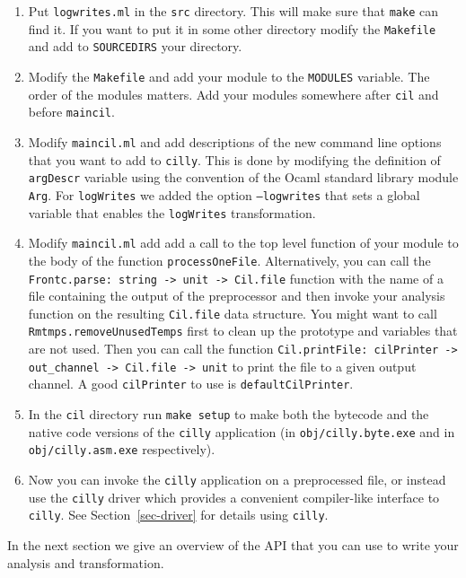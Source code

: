 \documentclass{article}
\def\secref#1{Section~\ref{sec-#1}}
\def\t#1{{\tt #1}}
\begin{document}
 \begin{enumerate}
 \item Put \t{logwrites.ml} in the \t{src} directory. This will make sure that
 \t{make} can find it. If you want to put it in some other directory modify
 the \t{Makefile} and add to \t{SOURCEDIRS} your directory. 

 \item Modify the \t{Makefile} and add your module to the \t{MODULES}
 variable. The order of the modules matters. Add your modules somewhere after
 \t{cil} and before \t{maincil}.

 \item Modify \t{maincil.ml} and add descriptions of the new command line
 options that you want to add to \t{cilly}. This is done by modifying the
 definition of \t{argDescr} variable using the convention of the Ocaml
 standard library module \t{Arg}. For \t{logWrites} we added the option
 \t{--logwrites} that sets a global variable that enables the \t{logWrites}
 transformation.

 \item Modify \t{maincil.ml} add add a call to the top level function of your
 module to the body of the function \t{processOneFile}. Alternatively, you can
 call the \t{Frontc.parse: string -> unit -> Cil.file} function with the name
 of a file containing the output of the preprocessor and then invoke your
 analysis function on the resulting \t{Cil.file} data structure. You might
 want to call \t{Rmtmps.removeUnusedTemps} first to clean up the prototype and
 variables that are not used. Then you can call the function \t{Cil.printFile:
 cilPrinter -> out\_channel -> Cil.file -> unit} to print the file to a given
 output channel. A good \t{cilPrinter} to use is \t{defaultCilPrinter}. 

 \item In the \t{cil} directory run \t{make setup} to make both the bytecode
 and the native code versions of the \t{cilly} application (in
 \t{obj/cilly.byte.exe} and in \t{obj/cilly.asm.exe} respectively).

 \item Now you can invoke the \t{cilly} application on a preprocessed file, or
 instead use the \t{cilly} driver which provides a convenient compiler-like
 interface to \t{cilly}. See \secref{driver} for details using \t{cilly}.
 \end{enumerate}

 In the next section we give an overview of the API that you can use
to write your analysis and transformation. 
 
\end{document}
